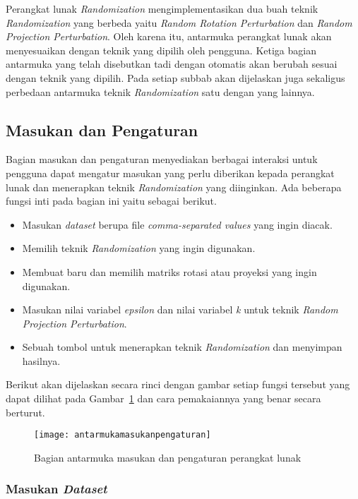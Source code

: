 Perangkat lunak \textit{Randomization} mengimplementasikan dua buah teknik \textit{Randomization} yang berbeda yaitu \textit{Random Rotation Perturbation} dan \textit{Random Projection Perturbation}. Oleh karena itu, antarmuka perangkat lunak akan menyesuaikan dengan teknik yang dipilih oleh pengguna. Ketiga bagian antarmuka yang telah disebutkan tadi dengan otomatis akan berubah sesuai dengan teknik yang dipilih. Pada setiap subbab akan dijelaskan juga sekaligus perbedaan antarmuka teknik \textit{Randomization} satu dengan yang lainnya.

\subsection{Masukan dan Pengaturan}
\label{subsec:masukanpengaturan}

Bagian masukan dan pengaturan menyediakan berbagai interaksi untuk pengguna dapat mengatur masukan yang perlu diberikan kepada perangkat lunak dan menerapkan teknik \textit{Randomization} yang diinginkan. Ada beberapa fungsi inti pada bagian ini yaitu sebagai berikut.
\begin{itemize}
	\item Masukan \textit{dataset} berupa file \textit{comma-separated values} yang ingin diacak.
	\item Memilih teknik \textit{Randomization} yang ingin digunakan.
	\item Membuat baru dan memilih matriks rotasi atau proyeksi yang ingin digunakan.
	\item Masukan nilai variabel \textit{epsilon} dan nilai variabel \textit{k} untuk teknik \textit{Random Projection Perturbation}.
	\item Sebuah tombol untuk menerapkan teknik \textit{Randomization} dan menyimpan hasilnya.
\end{itemize}
Berikut akan dijelaskan secara rinci dengan gambar setiap fungsi tersebut yang dapat dilihat pada Gambar~\ref{fig:antarmukamasukanpengaturan} dan cara pemakaiannya yang benar secara berturut. 

\begin{figure}
	\centering
	\texttt{[image: antarmukamasukanpengaturan]}
	\caption{Bagian antarmuka masukan dan pengaturan perangkat lunak}
	\label{fig:antarmukamasukanpengaturan}
\end{figure}

\subsubsection{Masukan \textit{Dataset}}
\label{subsubsec:masukandataset}

